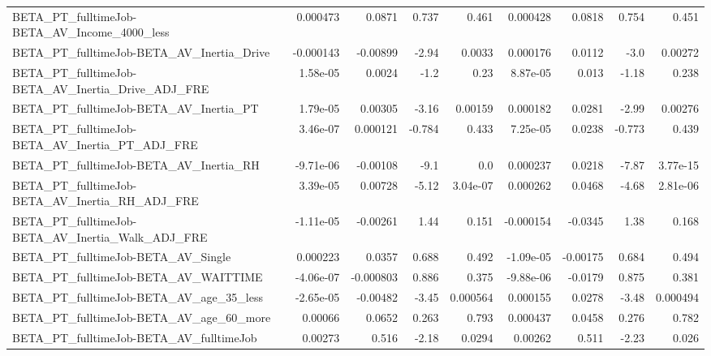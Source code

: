 \begin{tabular}{lrrrrrrrr}
BETA\_PT\_fulltimeJob-BETA\_AV\_Income\_4000\_less       &    0.000473 &       0.0871 &    0.737 &    0.461 &   0.000428 &      0.0818 &        0.754 &         0.451 \\
BETA\_PT\_fulltimeJob-BETA\_AV\_Inertia\_Drive          &   -0.000143 &     -0.00899 &    -2.94 &   0.0033 &   0.000176 &      0.0112 &         -3.0 &       0.00272 \\
BETA\_PT\_fulltimeJob-BETA\_AV\_Inertia\_Drive\_ADJ\_FRE  &    1.58e-05 &       0.0024 &     -1.2 &     0.23 &   8.87e-05 &       0.013 &        -1.18 &         0.238 \\
BETA\_PT\_fulltimeJob-BETA\_AV\_Inertia\_PT             &    1.79e-05 &      0.00305 &    -3.16 &  0.00159 &   0.000182 &      0.0281 &        -2.99 &       0.00276 \\
BETA\_PT\_fulltimeJob-BETA\_AV\_Inertia\_PT\_ADJ\_FRE     &    3.46e-07 &     0.000121 &   -0.784 &    0.433 &   7.25e-05 &      0.0238 &       -0.773 &         0.439 \\
BETA\_PT\_fulltimeJob-BETA\_AV\_Inertia\_RH             &   -9.71e-06 &     -0.00108 &     -9.1 &      0.0 &   0.000237 &      0.0218 &        -7.87 &      3.77e-15 \\
BETA\_PT\_fulltimeJob-BETA\_AV\_Inertia\_RH\_ADJ\_FRE     &    3.39e-05 &      0.00728 &    -5.12 & 3.04e-07 &   0.000262 &      0.0468 &        -4.68 &      2.81e-06 \\
BETA\_PT\_fulltimeJob-BETA\_AV\_Inertia\_Walk\_ADJ\_FRE   &   -1.11e-05 &     -0.00261 &     1.44 &    0.151 &  -0.000154 &     -0.0345 &         1.38 &         0.168 \\
BETA\_PT\_fulltimeJob-BETA\_AV\_Single                 &    0.000223 &       0.0357 &    0.688 &    0.492 &  -1.09e-05 &    -0.00175 &        0.684 &         0.494 \\
BETA\_PT\_fulltimeJob-BETA\_AV\_WAITTIME               &   -4.06e-07 &    -0.000803 &    0.886 &    0.375 &  -9.88e-06 &     -0.0179 &        0.875 &         0.381 \\
BETA\_PT\_fulltimeJob-BETA\_AV\_age\_35\_less            &   -2.65e-05 &     -0.00482 &    -3.45 & 0.000564 &   0.000155 &      0.0278 &        -3.48 &      0.000494 \\
BETA\_PT\_fulltimeJob-BETA\_AV\_age\_60\_more            &     0.00066 &       0.0652 &    0.263 &    0.793 &   0.000437 &      0.0458 &        0.276 &         0.782 \\
BETA\_PT\_fulltimeJob-BETA\_AV\_fulltimeJob            &     0.00273 &        0.516 &    -2.18 &   0.0294 &    0.00262 &       0.511 &        -2.23 &         0.026 \\

\end{tabular}

